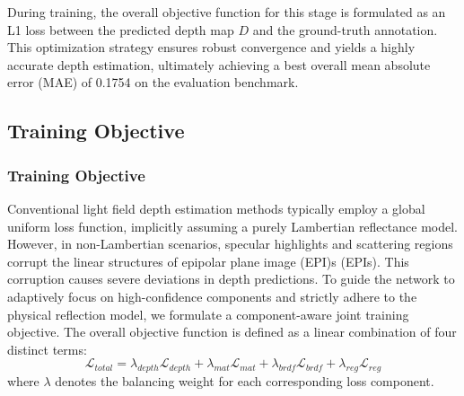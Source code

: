 \documentclass[lettersize,journal]{IEEEtran}
\begin{document}
During training, the overall objective function for this stage is formulated as an L1 loss between the predicted depth map $D$ and the ground-truth annotation. This optimization strategy ensures robust convergence and yields a highly accurate depth estimation, ultimately achieving a best overall mean absolute error (MAE) of 0.1754 on the evaluation benchmark.

\subsection{Training Objective}

\subsubsection{Training Objective}

Conventional light field depth estimation methods typically employ a global uniform loss function, implicitly assuming a purely Lambertian reflectance model. However, in non-Lambertian scenarios, specular highlights and scattering regions corrupt the linear structures of epipolar plane image (EPI)s (EPIs). This corruption causes severe deviations in depth predictions. To guide the network to adaptively focus on high-confidence components and strictly adhere to the physical reflection model, we formulate a component-aware joint training objective. The overall objective function is defined as a linear combination of four distinct terms:
\begin{equation}
\label{eq:eq11}
\mathcal{L}_{total} = \lambda_{depth} \mathcal{L}_{depth} + \lambda_{mat} \mathcal{L}_{mat} + \lambda_{brdf} \mathcal{L}_{brdf} + \lambda_{reg} \mathcal{L}_{reg}
\end{equation}
where $\lambda$ denotes the balancing weight for each corresponding loss component.
\end{document}
